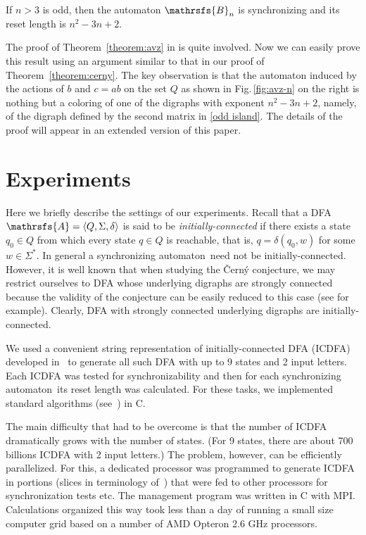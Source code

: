 \documentclass[11pt]{llncs}
\newcommand{\san}{synchronizing automaton}
\begin{document}
\begin{theorem}
\label{theorem:avz}
If $n>3$ is odd, then the automaton $\mathrsfs{B}_n$ is synchronizing and
its reset length is $n^2-3n+2$.
\end{theorem}

The proof of Theorem~\ref{theorem:avz} in \cite{AVZ} is quite involved. Now we can easily
prove this result using an argument similar to that in our proof of Theorem~\ref{theorem:cerny}.
The key observation is that the automaton induced by the actions of $b$ and $c=ab$ on the set $Q$
as shown in Fig.\,\ref{fig:avz-n} on the right is nothing but a coloring of one of the digraphs
with exponent $n^2-3n+2$, namely, of the digraph defined by the second matrix in \eqref{odd island}.
The details of the proof will appear in an extended version of this paper.

\section{Experiments}
\label{experiments}

Here we briefly describe the settings of our experiments. Recall that a DFA
$\mathrsfs{A}=\langle Q,\Sigma,\delta\rangle$ is said to be \emph{initially-connected}
if there exists a state $q_0\in Q$ from which every state $q\in Q$ is reachable,
that is, $q=\delta(q_0,w)$ for some $w\in\Sigma^*$. In general a \san\ need not
be initially-connected. However, it is well known that when studying the \v{C}ern\'{y}
conjecture, we may restrict ourselves to DFA whose underlying digraphs are strongly
connected because the validity of the conjecture can be easily reduced to this case
(see \cite{Pi78} for example). Clearly, DFA with strongly connected underlying digraphs
are initially-connected.

We used a convenient string representation of initially-connected DFA (ICDFA)
developed in~\cite{AMR} to generate all such DFA with up to 9 states and 2 input
letters. Each ICDFA was tested for synchronizability and then for each \san\
its reset length was calculated. For these tasks, we implemented standard
algorithms (see~\cite{Sa05,Vo08}) in C.

The main difficulty that had to be overcome is that the number of ICDFA dramatically
grows with the number of states. (For 9 states, there are about 700 billions
ICDFA with 2 input letters.) The problem, however, can be efficiently parallelized.
For this, a dedicated processor was programmed to generate ICDFA in portions (slices
in terminology of~\cite{AMR}) that were fed to other processors for synchronization
tests etc. The management program was written in C with MPI. Calculations organized
this way took less than a day of running a small size computer grid based on a number
of AMD Opteron 2.6 GHz processors.
\end{document}
